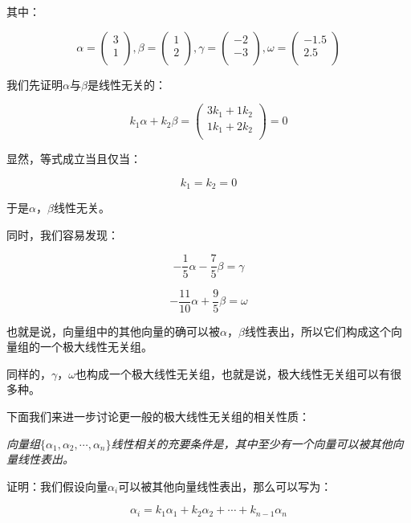 \documentclass[a4paper]{ctexart}
\begin{document}
其中：

$$
\alpha=
\left(
  \begin{array}{cccc}
    3\\
    1\\
  \end{array}
\right)
,
\beta=
\left(
  \begin{array}{cccc}
    1\\
    2\\
  \end{array}
\right)
,
\gamma=
\left(
  \begin{array}{cccc}
    -2\\
    -3\\
  \end{array}
\right)
,
\omega=
\left(
  \begin{array}{cccc}
    -1.5\\
    2.5\\
  \end{array}
\right)
$$

我们先证明$\alpha$与$\beta$是线性无关的：

$$
k_1\alpha+k_2\beta
=
\left(
  \begin{array}{cccc}
    3k_1+1k_2\\
    1k_1+2k_2\\
  \end{array}
\right)
=
0
$$
  
显然，等式成立当且仅当：

$$
k_1=k_2=0
$$

于是$\alpha$，$\beta$线性无关。

同时，我们容易发现：

$$
-\frac{1}{5}\alpha-\frac{7}{5}\beta=\gamma
$$

$$
-\frac{11}{10}\alpha+\frac{9}{5}\beta=\omega
$$

也就是说，向量组中的其他向量的确可以被$\alpha$，$\beta$线性表出，所以它们构成这个向量组的一个极大线性无关组。

同样的，$\gamma$，$\omega$也构成一个极大线性无关组，也就是说，极大线性无关组可以有很多种。

下面我们来进一步讨论更一般的极大线性无关组的相关性质：

\textit{向量组$\{\alpha_1,\alpha_2,\cdots,\alpha_n\}$线性相关的充要条件是，其中至少有一个向量可以被其他向量线性表出。}

证明：我们假设向量$\alpha_{i}$可以被其他向量线性表出，那么可以写为：

$$
\alpha_{i}=k_{1}\alpha_{1}+k_{2}\alpha_{2}+\cdots+k_{n-1}\alpha_{n}
$$
\end{document}
